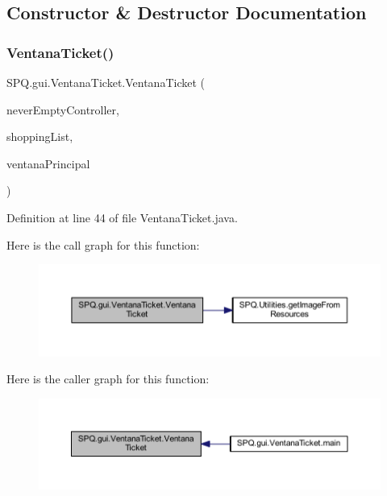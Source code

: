 \subsection{Constructor \& Destructor Documentation}
\mbox{\label{class_s_p_q_1_1gui_1_1_ventana_ticket_a27ed535b91869f2e407303220482288e}} 
\subsubsection{\texorpdfstring{Ventana\+Ticket()}{VentanaTicket()}}
{\footnotesize\ttfamily S\+P\+Q.\+gui.\+Ventana\+Ticket.\+Ventana\+Ticket (\begin{DoxyParamCaption}\item[{\mbox{\hyperlink{class_s_p_q_1_1controller_1_1_never_empty_controller}{Never\+Empty\+Controller}}}]{never\+Empty\+Controller,  }\item[{List$<$ \mbox{\hyperlink{class_s_p_q_1_1gui_1_1component_1_1_product_label}{Product\+Label}} $>$}]{shopping\+List,  }\item[{\mbox{\hyperlink{class_s_p_q_1_1gui_1_1_ventana_principal}{Ventana\+Principal}}}]{ventana\+Principal }\end{DoxyParamCaption})}



Definition at line 44 of file Ventana\+Ticket.\+java.

Here is the call graph for this function\+:\nopagebreak
\begin{figure}[H]
\begin{center}
\leavevmode
\includegraphics[width=350pt]{class_s_p_q_1_1gui_1_1_ventana_ticket_a27ed535b91869f2e407303220482288e_cgraph}
\end{center}
\end{figure}
Here is the caller graph for this function\+:\nopagebreak
\begin{figure}[H]
\begin{center}
\leavevmode
\includegraphics[width=350pt]{class_s_p_q_1_1gui_1_1_ventana_ticket_a27ed535b91869f2e407303220482288e_icgraph}
\end{center}
\end{figure}


